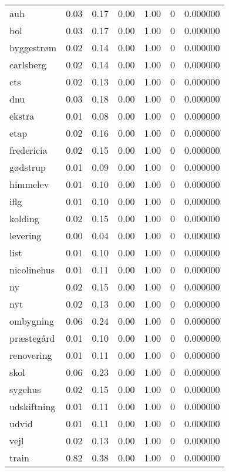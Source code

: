 \begin{longtable}{lllllrr}
auh & 0.03 & 0.17 & 0.00 & 1.00 & 0 & 0.000000 \\
bol & 0.03 & 0.17 & 0.00 & 1.00 & 0 & 0.000000 \\
byggestrøm & 0.02 & 0.14 & 0.00 & 1.00 & 0 & 0.000000 \\
carlsberg & 0.02 & 0.14 & 0.00 & 1.00 & 0 & 0.000000 \\
cts & 0.02 & 0.13 & 0.00 & 1.00 & 0 & 0.000000 \\
dnu & 0.03 & 0.18 & 0.00 & 1.00 & 0 & 0.000000 \\
ekstra & 0.01 & 0.08 & 0.00 & 1.00 & 0 & 0.000000 \\
etap & 0.02 & 0.16 & 0.00 & 1.00 & 0 & 0.000000 \\
fredericia & 0.02 & 0.15 & 0.00 & 1.00 & 0 & 0.000000 \\
gødstrup & 0.01 & 0.09 & 0.00 & 1.00 & 0 & 0.000000 \\
himmelev & 0.01 & 0.10 & 0.00 & 1.00 & 0 & 0.000000 \\
iflg & 0.01 & 0.10 & 0.00 & 1.00 & 0 & 0.000000 \\
kolding & 0.02 & 0.15 & 0.00 & 1.00 & 0 & 0.000000 \\
levering & 0.00 & 0.04 & 0.00 & 1.00 & 0 & 0.000000 \\
list & 0.01 & 0.10 & 0.00 & 1.00 & 0 & 0.000000 \\
nicolinehus & 0.01 & 0.11 & 0.00 & 1.00 & 0 & 0.000000 \\
ny & 0.02 & 0.15 & 0.00 & 1.00 & 0 & 0.000000 \\
nyt & 0.02 & 0.13 & 0.00 & 1.00 & 0 & 0.000000 \\
ombygning & 0.06 & 0.24 & 0.00 & 1.00 & 0 & 0.000000 \\
præstegård & 0.01 & 0.10 & 0.00 & 1.00 & 0 & 0.000000 \\
renovering & 0.01 & 0.11 & 0.00 & 1.00 & 0 & 0.000000 \\
skol & 0.06 & 0.23 & 0.00 & 1.00 & 0 & 0.000000 \\
sygehus & 0.02 & 0.15 & 0.00 & 1.00 & 0 & 0.000000 \\
udskiftning & 0.01 & 0.11 & 0.00 & 1.00 & 0 & 0.000000 \\
udvid & 0.01 & 0.11 & 0.00 & 1.00 & 0 & 0.000000 \\
vejl & 0.02 & 0.13 & 0.00 & 1.00 & 0 & 0.000000 \\
train & 0.82 & 0.38 & 0.00 & 1.00 & 0 & 0.000000 \\
\end{longtable}
